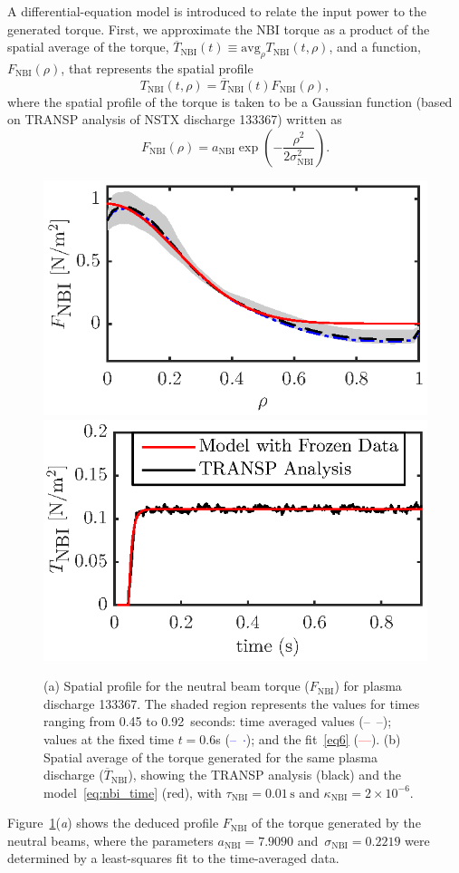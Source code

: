\documentclass[12pt,lot, lof]{puthesis}
\begin{document}
A differential-equation model is introduced to relate the input power to the generated torque.  First, we approximate the NBI torque as a product of the spatial average of the torque, $\overline{T}_\text{NBI}(t) \equiv \text{avg}_\rho T_\text{NBI}(t,\rho)$, and a function, $F_\text{NBI}(\rho)$, that represents the spatial profile
\begin{equation}
   T_\text{NBI}(t,\rho) = \overline{T}_\text{NBI}(t) F_\text{NBI}(\rho),
\label{eq5}
\end{equation}
where the spatial profile of the torque is taken to be a Gaussian function (based on TRANSP analysis of NSTX discharge 133367) written as
\begin{equation}
F_\text{NBI}(\rho) = a_\text{NBI} \exp\left( - \frac{\rho^2}{2\sigma^2_\text{NBI}}\right).
\label{eq6}
\end{equation}
%
\begin{figure}
\includegraphics[width=0.47 \linewidth]{fig4a} \hspace{-2.7em}\hspace{2em}
\includegraphics[width=0.47 \linewidth]{fig4b} \hspace{-2.7em}
\caption{(a) Spatial profile for the neutral beam torque ($F_\text{NBI} $) for
  plasma discharge 133367.  The shaded region represents the values for times
  ranging from 0.45 to 0.92~seconds: time averaged values (--~--); values at the
  fixed time $t=0.6$s  (\textcolor{blue}{--~$\cdot$}); and
  the fit~\eqref{eq6} (\textcolor{red}{---}).
  (b) Spatial average of the torque generated for the same plasma discharge
  ($ \overline{T}_\text{NBI}$), showing the TRANSP analysis
  (black) and the model~\eqref{eq:nbi_time} (red),
  with
  $\tau_\text{NBI} = 0.01\,\text{s}$ and  $\kappa_\text{NBI} =
  2\times10^{-6} $.}
\label{fig:Fnbi}
\end{figure}
%
Figure~{\ref{fig:Fnbi}}(\emph{a}) shows the deduced profile $F_\text{NBI}$ of
the torque generated by the neutral beams, where the parameters
$a_\text{NBI}= 7.9090$
and~$\sigma_\text{NBI}= 0.2219$ were determined by a least-squares fit to the
time-averaged data.
\end{document}
